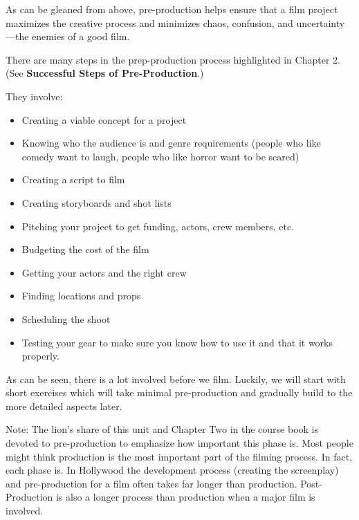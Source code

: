 \documentclass[
]{book}
\providecommand{\tightlist}{%
  \setlength{\itemsep}{0pt}\setlength{\parskip}{0pt}}
\begin{document}
As can be gleaned from above, pre-production helps ensure that a film project maximizes the creative process and minimizes chaos, confusion, and uncertainty---the enemies of a good film.

There are many steps in the prep-production process highlighted in Chapter 2. (See \textbf{Successful Steps of Pre-Production}.)

They involve:

\begin{itemize}
\tightlist
\item
  Creating a viable concept for a project\\
\item
  Knowing who the audience is and genre requirements (people who like comedy want to laugh, people who like horror want to be scared)\\
\item
  Creating a script to film\\
\item
  Creating storyboards and shot lists\\
\item
  Pitching your project to get funding, actors, crew members, etc.\\
\item
  Budgeting the cost of the film\\
\item
  Getting your actors and the right crew\\
\item
  Finding locations and props\\
\item
  Scheduling the shoot\\
\item
  Testing your gear to make sure you know how to use it and that it works properly.
\end{itemize}

As can be seen, there is a lot involved before we film. Luckily, we will start with short exercises which will take minimal pre-production and gradually build to the more detailed aspects later.

Note: The lion's share of this unit and Chapter Two in the course book is devoted to pre-production to emphasize how important this phase is. Most people might think production is the most important part of the filming process. In fact, each phase is. In Hollywood the development process (creating the screenplay) and pre-production for a film often takes far longer than production. Post-Production is also a longer process than production when a major film is involved.
\end{document}
